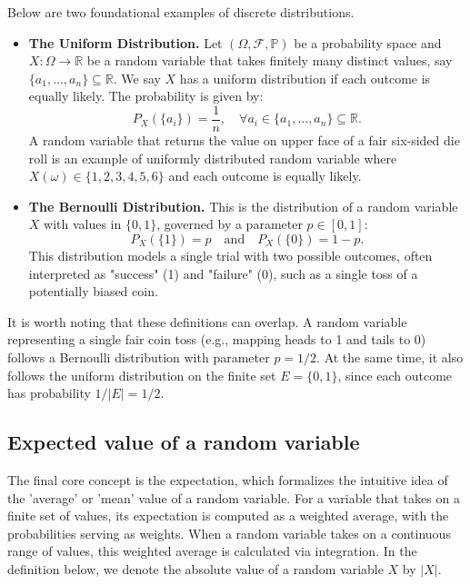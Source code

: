 \begin{example}
    \label{ex:classical-distributions}
    Below are two foundational examples of discrete distributions.

    \begin{itemize}
        \item \textbf{The Uniform Distribution.} Let $(\Omega, \mathcal{F}, \mathbb{P})$ be a probability space and  $X: \Omega \to \mathbb{R}$ be a random variable that takes finitely many distinct values, say $\{a_1, \dots, a_n\} \subseteq \mathbb{R}$. We say $X$ has a uniform distribution if each outcome is equally likely. The probability is given by:
        \[
            P_X(\{a_i\}) = \frac{1}{n}, \quad \forall a_i \in \{a_1, \dots, a_n\} \subseteq \mathbb{R}.
        \]
        A random variable that returns the value on upper face of a fair six-sided die roll is an example of uniformly distributed random variable where $X(\omega) \in \{1, 2, 3, 4, 5, 6\}$ and each outcome is equally likely.

        \item \textbf{The Bernoulli Distribution.} This is the distribution of a random variable $X$ with values in $\{0, 1\}$, governed by a parameter $p \in [0, 1]$:
        \[
            P_X(\{1\}) = p \quad \text{and} \quad P_X(\{0\}) = 1 - p.
        \]
        This distribution models a single trial with two possible outcomes, often interpreted as "success" (1) and "failure" (0), such as a single toss of a potentially biased coin.
    \end{itemize}
\end{example}

It is worth noting that these definitions can overlap. A random variable representing a single fair coin toss (e.g., mapping heads to 1 and tails to 0) follows a Bernoulli distribution with parameter $p=1/2$. At the same time, it also follows the uniform distribution on the finite set $E=\{0, 1\}$, since each outcome has probability $1/|E| = 1/2$.

\subsection{Expected value of a random variable}

The final core concept is the expectation, which formalizes the intuitive idea of the 'average' or 'mean' value of a random variable. For a variable that takes on a finite set of values, its expectation is computed as a weighted average, with the probabilities serving as weights. When a random variable takes on a continuous range of values, this weighted average is calculated via integration. In the definition below, we denote the absolute value of a random variable $X$ by $|X|$.

